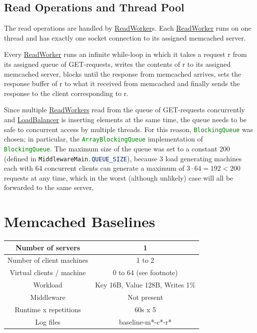 \documentclass[11pt]{article}
\newcommand{\code}[1]{\lstinline[language=Java]{#1}}
\newcommand{\linkmain}[1]{\href{https://gitlab.inf.ethz.ch/pungast/asl-fall16-project/blob/master/src/main/java/asl/#1.java}{#1}}
\begin{document}
\subsection{Read Operations and Thread Pool}\label{sec:desc:reads}

The read operations are handled by \href{https://gitlab.inf.ethz.ch/pungast/asl-fall16-project/blob/master/src/main/java/asl/ReadWorker.java}{ReadWorker}s. Each \linkmain{ReadWorker} runs on one thread and has exactly one socket connection to its assigned memcached server.

Every \linkmain{ReadWorker} runs an infinite while-loop in which it takes a request r from its assigned queue of GET-requests, writes the contents of r to its assigned memcached server, blocks until the response from memcached arrives, sets the response buffer of r to what it received from memcached and finally sends the response to the client corresponding to r.

Since multiple \linkmain{ReadWorkers} read from the queue of GET-requests concurrently and \linkmain{LoadBalancer} is inserting elements at the same time, the queue needs to be safe to concurrent access by multiple threads. For this reason, \code{BlockingQueue} was chosen; in particular, the \code{ArrayBlockingQueue} implementation of \code{BlockingQueue}. The maximum size of the queue was set to a constant 200 (defined in \code{MiddlewareMain.QUEUE_SIZE}), because 3 load generating machines each with 64 concurrent clients can generate a maximum of $3 \cdot 64 = 192 < 200$ requests at any time, which in the worst (although unlikely) case will all be forwarded to the same server.


\section{Memcached Baselines}\label{sec:baseline}

\begin{center}
\small{
\smallskip
\begin{tabular}{|c|c|}
\hline Number of servers & 1 \\ 
\hline Number of client machines & 1 to 2 \\ 
\hline Virtual clients / machine & 0 to 64 (see footnote\footnotemark)\\ 
\hline Workload & Key 16B, Value 128B, Writes 1\% \\
\hline Middleware & Not present \\ 
\hline Runtime x repetitions & 60s x 5 \\ 
\hline Log files & baseline-m*-c*-r* \\
\hline 
\end{tabular} }
\end{center}
\end{document}
